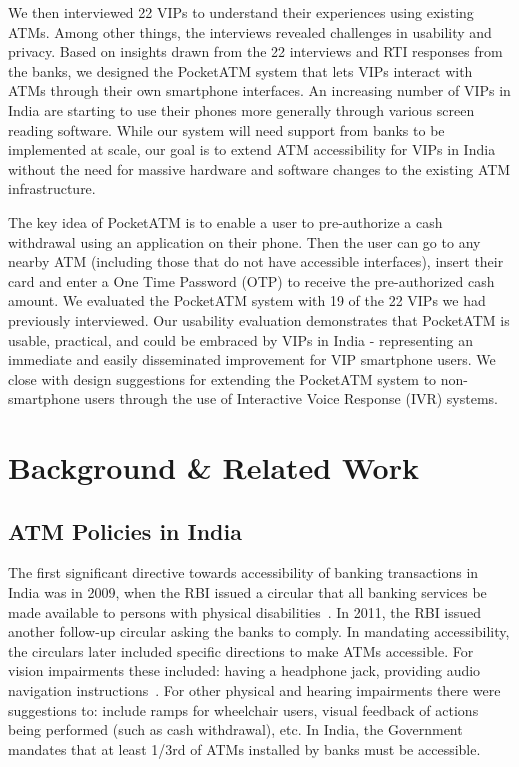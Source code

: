 We then interviewed 22 VIPs to understand their experiences using existing ATMs. Among other things, the interviews revealed challenges in usability and privacy. Based on insights drawn from the 22 interviews and RTI responses from the banks, we designed the PocketATM system that lets VIPs interact with ATMs through their own smartphone interfaces. An increasing number of VIPs in India are starting to use their phones more generally through various screen reading software. While our system will need support from banks to be implemented at scale, our goal is to extend ATM accessibility for VIPs in India without the need for massive hardware and software changes to the existing ATM infrastructure.

The key idea of PocketATM is to enable a user to pre-authorize a cash withdrawal using an application on their phone. Then the user can go to any nearby ATM (including those that do not have accessible interfaces), insert their card and enter a One Time Password (OTP) to receive the pre-authorized cash amount. We evaluated the PocketATM system with 19 of the 22 VIPs we had previously interviewed. Our usability evaluation demonstrates that PocketATM is usable, practical, and could be embraced by VIPs in India - representing an immediate and easily disseminated improvement for VIP smartphone users. We close with design suggestions for extending the PocketATM system to non-smartphone users through the use of Interactive Voice Response (IVR) systems.

\section{Background \& Related Work}
\label{sec:background}

\subsection{ATM Policies in India}
\label{ssec:atmpolicies}

The first significant directive towards accessibility of banking transactions in India was in 2009, when the RBI issued a circular that all banking services be made available to persons with physical disabilities~\cite{RBI2008}. In 2011, the RBI issued another follow-up circular asking the banks to comply. In mandating accessibility, the circulars later included specific directions to make ATMs accessible. For vision impairments these included: having a headphone jack, providing audio navigation instructions~\cite{RBI2007}. For other physical and hearing impairments there were suggestions to: include ramps for wheelchair users, visual feedback of actions being performed (such as cash withdrawal), etc. In India, the Government mandates that at least 1/3rd of ATMs installed by banks must be accessible.

